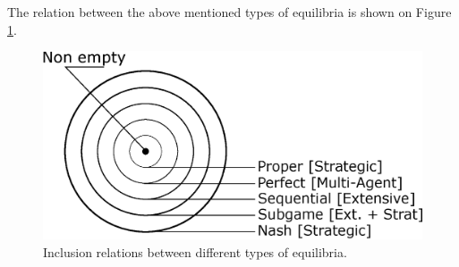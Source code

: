 The relation between the above mentioned types of  equilibria is shown on Figure \ref{ch5:fig:equilibriaRelation}.

\begin{figure}[!ht]
\centering
\includegraphics[scale=0.7]{equilibriaRelation.eps}
\caption{Inclusion relations between different types of equilibria.}
\label{ch5:fig:equilibriaRelation}
\end{figure}






\ifx \globalmark \undefined %


	
\else

\fi
